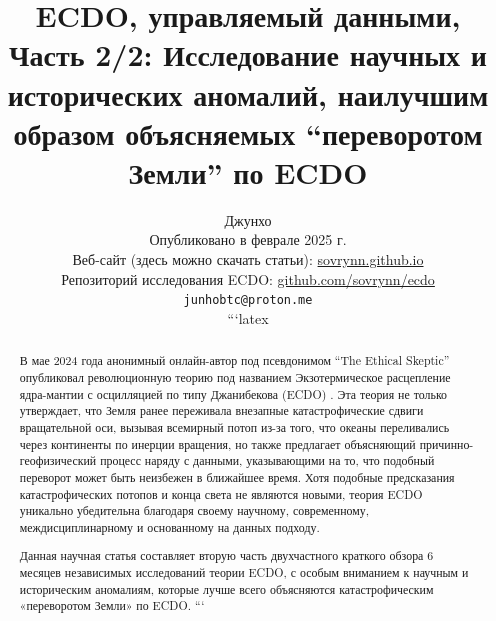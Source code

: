 \documentclass[10pt,twocolumn,letterpaper]{article}
\begin{document}
\title{ECDO, управляемый данными, Часть 2/2: Исследование научных и исторических аномалий, наилучшим образом объясняемых “переворотом Земли” по ECDO}

\author{Джунхо\\
Опубликовано в феврале 2025 г.\\
Веб-сайт (здесь можно скачать статьи): \href{https://sovrynn.github.io}{sovrynn.github.io}\\
Репозиторий исследования ECDO: \href{https://github.com/sovrynn/ecdo}{github.com/sovrynn/ecdo}\\
{\tt\small junhobtc@proton.me}

```latex
}

\maketitle

\begin{abstract}
В мае 2024 года анонимный онлайн-автор под псевдонимом “The Ethical Skeptic” \cite{0} опубликовал революционную теорию под названием Экзотермическое расцепление ядра-мантии с осцилляцией по типу Джанибекова (ECDO) \cite{1}. Эта теория не только утверждает, что Земля ранее переживала внезапные катастрофические сдвиги вращательной оси, вызывая всемирный потоп из-за того, что океаны переливались через континенты по инерции вращения, но также предлагает объясняющий причинно-геофизический процесс наряду с данными, указывающими на то, что подобный переворот может быть неизбежен в ближайшее время. Хотя подобные предсказания катастрофических потопов и конца света не являются новыми, теория ECDO уникально убедительна благодаря своему научному, современному, междисциплинарному и основанному на данных подходу.

Данная научная статья составляет вторую часть двухчастного краткого обзора 6 месяцев независимых исследований \cite{2,20} теории ECDO, с особым вниманием к научным и историческим аномалиям, которые лучше всего объясняются катастрофическим «переворотом Земли» по ECDO.
```
\end{abstract}
\end{document}
